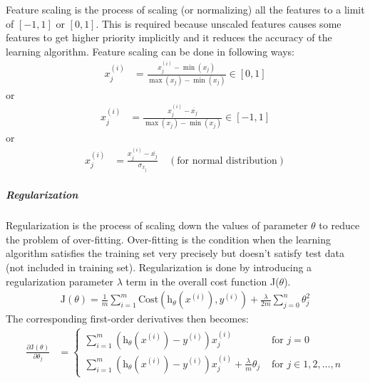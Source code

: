 Feature scaling is the process of scaling (or normalizing) all the features
to a limit of $[-1,1]$ or $[0,1]$. This is required because unscaled features
causes some features to get higher priority implicitly and it reduces
the accuracy of the learning algorithm. Feature scaling can be done in following
ways:
\begin{align}
  x_j^{(i)} &= \frac{x_j^{(i)} - \min (x_j)}{ \max (x_j) - \min (x_j)}
  \in [0, 1]
  \nonumber
\end{align}
or
\begin{align}
  x_j^{(i)} &= \frac{x_j^{(i)} - \overline{x_j}}{ \max (x_j) - \min (x_j)}
  \in [-1, 1]
  \nonumber
\end{align}
or
\begin{align}
  x_j^{(i)} &= \frac{x_j^{(i)} - \overline{x_j}}{\sigma_{x_j}}
  \quad (\text{for normal distribution})
  \nonumber
\end{align}


\subparagraph{Regularization}

Regularization \cite{jason} is the process of scaling down the values of parameter $\theta$
to reduce the problem of over-fitting. Over-fitting is the condition when
the learning algorithm satisfies the training set very precisely but doesn't
satisfy test data (not included in training set). Regularization is done
by introducing a regularization parameter $\lambda$ term in the overall
cost function J($\theta$).
\begin{align}
  \text{J}(\theta) = \frac{1}{m} \sum_{i=1}^{m}
  \text{Cost} \left( \text{h}_\theta \left(x^{(i)} \right), y^{(i)} \right)
  + \frac{\lambda}{2m} \sum_{j=0}^n \theta_j^2
  \label{eqn:j-with-l}
\end{align}
The corresponding first-order derivatives then becomes:
\begin{align}
  \frac{\partial \text{J}(\theta)}{\partial \theta_j} &=
  \begin{cases}
    \displaystyle
    \sum_{i=1}^{m} \left( \text{h}_\theta \left(x^{(i)}\right) - y^{(i)} \right) x^{(i)}_j
    &\text{ for } j = 0\\
    \displaystyle
    \sum_{i=1}^{m} \left( \text{h}_\theta \left(x^{(i)}\right) - y^{(i)} \right) x^{(i)}_j
    + \frac{\lambda}{m} \theta_j
    &\text{ for } j \in {1,2,\ldots,n}
  \end{cases}
  \nonumber
\end{align}
